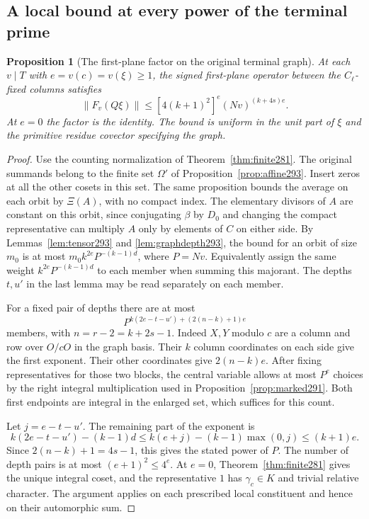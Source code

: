 \documentclass[a4paper,11pt]{article}
\newtheorem{proposition}{Proposition}[section]
\theoremstyle{definition}
\theoremstyle{remark}
\numberwithin{equation}{section}
\begin{document}
\subsection{A local bound at every power of the terminal prime}\label{nav:VI-53}
\begin{proposition}[The first-plane factor on the original terminal graph]\leavevmode
\label{prop:terminal293}
At each \(v\mid T\) with \(e=v(c)=v(\xi)\ge1\), the signed
first-plane operator between the \(C_\ell\)-fixed columns
satisfies
\[
        \|F_v(Q\xi)\|\le [4(k+1)^2]^e (Nv)^{(k+4s)e}.
\]
At \(e=0\) the factor is the identity. The bound is
uniform in the unit part of \(\xi\) and the primitive
residue covector specifying the graph.
\end{proposition}
\begin{proof}
Use the counting normalization of
Theorem~\ref{thm:finite281}. The original summands belong
to the finite set \(\Omega'\) of
Proposition~\ref{prop:affine293}. Insert zeros at all the
other cosets in this set. The same proposition bounds the
average on each orbit by \(\Xi(A)\), with no compact index.
The elementary divisors of \(A\) are constant on this
orbit, since conjugating \(\beta\) by \(D_0\) and changing
the compact representative can multiply \(A\) only by
elements of \(C\) on either side. By
Lemmas~\ref{lem:tensor293} and \ref{lem:graphdepth293},
the bound for an orbit of size \(m_0\) is at most
\(m_0 k^{2e}P^{-(k-1)d}\), where \(P=Nv\). Equivalently
assign the same weight \(k^{2e}P^{-(k-1)d}\) to each
member when summing this majorant. The depths \(t,u'\)
in the last lemma may be read separately on each member.

For a fixed pair of depths there are at most
\[
       P^{k(2e-t-u')+(2(n-k)+1)e}
\]
members, with \(n=r-2=k+2s-1\). Indeed \(X,Y\) modulo
\(c\) are a column and row over \(O/cO\) in the graph
basis. Their \(k\) column coordinates on each side give
the first exponent. Their other coordinates give
\(2(n-k)e\). After fixing representatives for those two
blocks, the central variable allows at most \(P^e\) choices
by the right integral multiplication used in
Proposition~\ref{prop:marked291}. Both first endpoints
are integral in the enlarged set, which suffices for
this count.

Let \(j=e-t-u'\). The remaining part of the exponent is
\[
      k(2e-t-u')-(k-1)d
       \le k(e+j)-(k-1)\max(0,j)\le (k+1)e .
\]
Since \(2(n-k)+1=4s-1\), this gives the stated power of
\(P\). The number of depth pairs is at most
\((e+1)^2\le4^e\). At \(e=0\),
Theorem~\ref{thm:finite281} gives the unique integral
coset, and the representative \(1\) has
\(\gamma_c\in K\) and trivial relative character. The
argument applies on each prescribed local constituent
and hence on their automorphic sum.
\end{proof}
\end{document}
